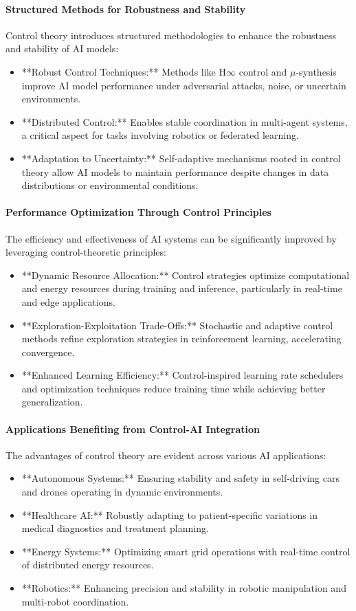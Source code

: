 \documentclass{IEEEojcsys}
\begin{document}
\paragraph{Structured Methods for Robustness and Stability}
Control theory introduces structured methodologies to enhance the robustness and stability of AI models:
\begin{itemize}
    \item **Robust Control Techniques:** Methods like H\ensuremath{\infty} control and $\mu$-synthesis improve AI model performance under adversarial attacks, noise, or uncertain environments.
    \item **Distributed Control:** Enables stable coordination in multi-agent systems, a critical aspect for tasks involving robotics or federated learning.
    \item **Adaptation to Uncertainty:** Self-adaptive mechanisms rooted in control theory allow AI models to maintain performance despite changes in data distributions or environmental conditions.
\end{itemize}

\paragraph{Performance Optimization Through Control Principles}
The efficiency and effectiveness of AI systems can be significantly improved by leveraging control-theoretic principles:
\begin{itemize}
    \item **Dynamic Resource Allocation:** Control strategies optimize computational and energy resources during training and inference, particularly in real-time and edge applications.
    \item **Exploration-Exploitation Trade-Offs:** Stochastic and adaptive control methods refine exploration strategies in reinforcement learning, accelerating convergence.
    \item **Enhanced Learning Efficiency:** Control-inspired learning rate schedulers and optimization techniques reduce training time while achieving better generalization.
\end{itemize}

\paragraph{Applications Benefiting from Control-AI Integration}
The advantages of control theory are evident across various AI applications:
\begin{itemize}
    \item **Autonomous Systems:** Ensuring stability and safety in self-driving cars and drones operating in dynamic environments.
    \item **Healthcare AI:** Robustly adapting to patient-specific variations in medical diagnostics and treatment planning.
    \item **Energy Systems:** Optimizing smart grid operations with real-time control of distributed energy resources.
    \item **Robotics:** Enhancing precision and stability in robotic manipulation and multi-robot coordination.
\end{itemize}
\end{document}
